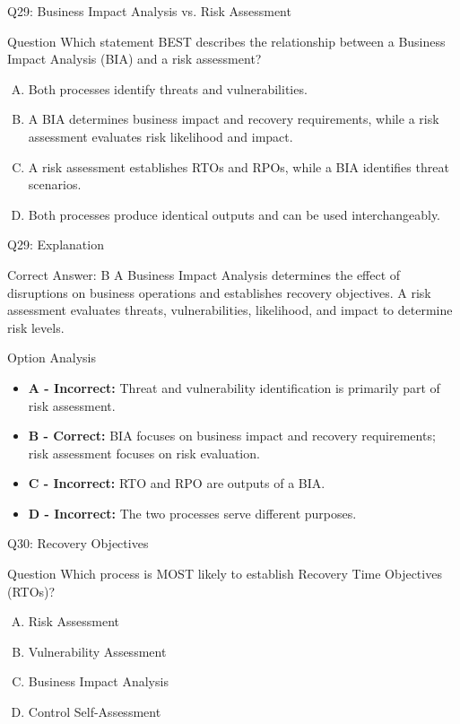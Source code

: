 \documentclass{beamer}
\begin{document}
	\begin{frame}{Q29: Business Impact Analysis vs. Risk Assessment} \begin{block}{Question} Which statement BEST describes the relationship between a Business Impact Analysis (BIA) and a risk assessment? \end{block} \begin{enumerate}[(A)] \item Both processes identify threats and vulnerabilities. \item A BIA determines business impact and recovery requirements, while a risk assessment evaluates risk likelihood and impact. \item A risk assessment establishes RTOs and RPOs, while a BIA identifies threat scenarios. \item Both processes produce identical outputs and can be used interchangeably. \end{enumerate} \end{frame} \begin{frame}{Q29: Explanation} \begin{block}{Correct Answer: B} A Business Impact Analysis determines the effect of disruptions on business operations and establishes recovery objectives. A risk assessment evaluates threats, vulnerabilities, likelihood, and impact to determine risk levels. \end{block} \begin{block}{Option Analysis} \begin{itemize} \item \textbf{A - Incorrect:} Threat and vulnerability identification is primarily part of risk assessment. \item \textbf{B - Correct:} BIA focuses on business impact and recovery requirements; risk assessment focuses on risk evaluation. \item \textbf{C - Incorrect:} RTO and RPO are outputs of a BIA. \item \textbf{D - Incorrect:} The two processes serve different purposes. \end{itemize} \end{block} \end{frame}
	
	
	\begin{frame}{Q30: Recovery Objectives}
		\begin{block}{Question}
			Which process is MOST likely to establish Recovery Time Objectives (RTOs)?
		\end{block}
		
		\begin{enumerate}[(A)]
			\item Risk Assessment
			\item Vulnerability Assessment
			\item Business Impact Analysis
			\item Control Self-Assessment
		\end{enumerate}
	\end{frame}
	
\end{document}
